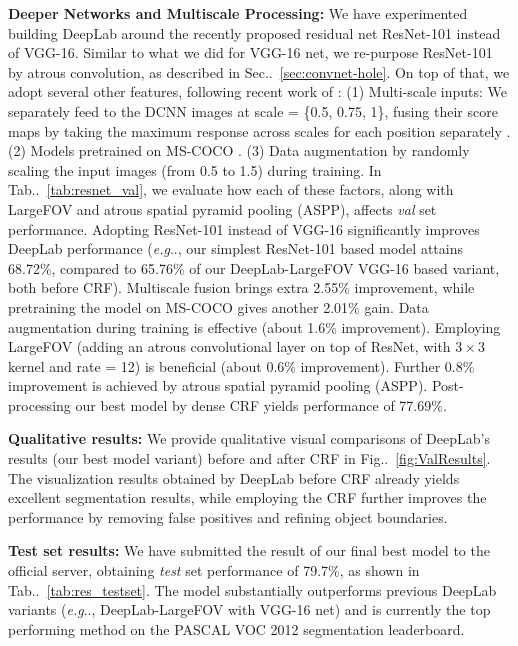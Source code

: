 \documentclass[10pt,journal,compsoc]{IEEEtran}
\makeatletter
\newcommand{\figref}[1]{Fig\onedot~\ref{#1}}
\newcommand{\secref}[1]{Sec\onedot~\ref{#1}}
\newcommand{\tabref}[1]{Tab\onedot~\ref{#1}}
\newcommand{\by}[2]{\ensuremath{#1 \! \times \! #2}}
\def\onedot{\ifx\@let@token.\else.\null\fi\xspace}
\def\eg{\emph{e.g}\onedot} \def\Eg{\emph{E.g}\onedot}
\makeatother
\begin{document}
\textbf{Deeper Networks and Multiscale Processing:} We have experimented
building DeepLab around the recently proposed residual net ResNet-101
\cite{he2015deep} instead of VGG-16. Similar to what we did for VGG-16 net,
we re-purpose ResNet-101 by atrous convolution, as described in
\secref{sec:convnet-hole}. On top of that, we adopt several other features,
following recent work of \cite{farabet2013learning, papandreou2015weakly,
  zheng2015conditional, liu2015semantic, lin2015efficient, chen2015attention,
  kokkinos2016pushing}: (1) Multi-scale inputs: We separately feed to the
DCNN images at scale = \{0.5, 0.75, 1\}, fusing their score maps by taking
the maximum response across scales for each position separately
\cite{chen2015attention}. (2) Models pretrained on MS-COCO
\cite{lin2014microsoft}. (3) Data augmentation by randomly scaling the input
images (from 0.5 to 1.5) during training. In \tabref{tab:resnet_val}, we
evaluate how each of these factors, along with LargeFOV and atrous spatial
pyramid pooling (ASPP), affects \textsl{val} set performance.
Adopting ResNet-101 instead of VGG-16 significantly improves DeepLab performance
(\eg, our simplest ResNet-101 based model attains 68.72\%, compared to 65.76\%
of our DeepLab-LargeFOV VGG-16 based variant, both before CRF). Multiscale
fusion \cite{chen2015attention} brings extra 2.55\% improvement, while
pretraining the model on MS-COCO gives another 2.01\% gain. Data augmentation
during training is effective (about 1.6\% improvement). Employing LargeFOV
(adding an atrous convolutional layer on top of ResNet, with \by{3}{3} kernel
and rate = 12) is beneficial (about 0.6\% improvement). Further 0.8\%
improvement is achieved by atrous spatial pyramid pooling (ASPP).
Post-processing our best model by dense CRF yields performance of 77.69\%.



\textbf{Qualitative results:} We provide qualitative visual comparisons of DeepLab's
results (our best model variant) before and after CRF in \figref{fig:ValResults}.
The visualization results obtained by DeepLab before CRF already yields excellent
segmentation results, while employing the CRF further improves the performance by
removing false positives and refining object boundaries. 




\textbf{Test set results:} We have submitted the result of our final best model
to the official server, obtaining \textit{test} set performance of 79.7\%, as
shown in \tabref{tab:res_testset}. The model substantially outperforms previous
DeepLab variants (\eg, DeepLab-LargeFOV with VGG-16 net) and is currently the
top performing method on the PASCAL VOC 2012 segmentation leaderboard. 
\end{document}
